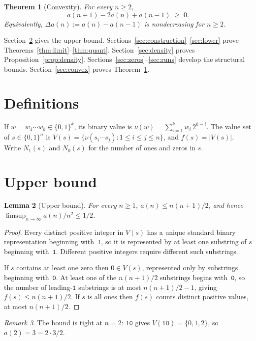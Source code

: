 ﻿\documentclass[11pt,a4paper]{article}
\theoremstyle{plain}
\newtheorem{theorem}{Theorem}
\newtheorem{lemma}[theorem]{Lemma}
\theoremstyle{definition}
\theoremstyle{remark}
\newtheorem{remark}[theorem]{Remark}
\newcommand{\val}{\nu}
\newcommand{\ones}{N_1}
\newcommand{\zeros}{N_0}
\begin{document}
\begin{theorem}[Convexity]\label{thm:convex}
For every $n\ge2$,
\[
  a(n+1)-2a(n)+a(n-1)\;\ge\;0.
\]
Equivalently, $\Delta a(n):=a(n)-a(n-1)$ is nondecreasing for $n\ge2$.
\end{theorem}

Section~\ref{sec:upper} gives the upper bound.
Sections~\ref{sec:construction}--\ref{sec:lower} prove
Theorems~\ref{thm:limit}--\ref{thm:quant}.
Section~\ref{sec:density} proves Proposition~\ref{prop:density}.
Sections~\ref{sec:zeros}--\ref{sec:runs} develop the structural bounds.
Section~\ref{sec:convex} proves Theorem~\ref{thm:convex}.

\section{Definitions}

If $w=w_1\cdots w_k\in\{0,1\}^k$, its binary value is
$\val(w)=\sum_{i=1}^k w_i\,2^{k-i}$.
The value set of $s\in\{0,1\}^n$ is
$V(s)=\{\val(s_i\cdots s_j):1\le i\le j\le n\}$,
and $f(s)=|V(s)|$.
Write $\ones(s)$ and $\zeros(s)$ for the number of ones and zeros in $s$.

\section{Upper bound}\label{sec:upper}

\begin{lemma}[Upper bound]\label{lem:upper}
For every $n\ge1$, $a(n)\le n(n+1)/2$, and hence
$\limsup_{n\to\infty}a(n)/n^2\le1/2$.
\end{lemma}

\begin{proof}
Every distinct positive integer in $V(s)$ has a unique standard binary
representation beginning with~$\mathtt{1}$, so it is represented by at
least one substring of $s$ beginning with~$\mathtt{1}$.  Different
positive integers require different such substrings.

If $s$ contains at least one zero then $0\in V(s)$, represented only by
substrings beginning with~$\mathtt{0}$.  At least one of the $n(n+1)/2$
substrings begins with~$\mathtt{0}$, so the number of leading-$\mathtt{1}$
substrings is at most $n(n+1)/2-1$, giving $f(s)\le n(n+1)/2$.  If $s$
is all ones then $f(s)$ counts distinct positive values, at most $n(n+1)/2$.
\end{proof}

\begin{remark}
The bound is tight at $n=2$: $\mathtt{10}$ gives $V(\mathtt{10})=\{0,1,2\}$,
so $a(2)=3=2\cdot3/2$.
\end{remark}
\end{document}
